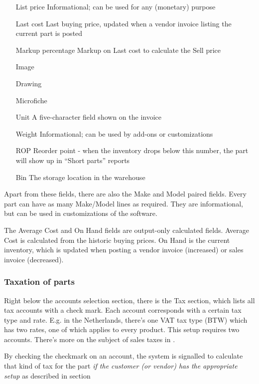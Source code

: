 \begin{itemize}
\item [List price] Informational; can be used for any (monetary) purpose
\item [Last cost] Last buying price, updated when a vendor invoice listing the current part
    is posted
\item [Markup percentage] Markup on Last cost to calculate the Sell price
\item [Image]
\item [Drawing]
\item [Microfiche]
\item [Unit] A five-character field shown on the invoice
\item [Weight] Informational; can be used by add-ons or customizations
\item [ROP] Reorder point - when the inventory drops below this number,
     the part will show up in ``Short parts'' reports
\item [Bin] The storage location in the warehouse
\end{itemize}


Apart from these fields, there are also the Make and Model paired fields. Every part
can have as many Make/Model lines as required. They are informational, but can be used
in customizations of the software.

The Average Cost and On Hand fields are output-only calculated fields. Average Cost is
calculated from the historic buying prices. On Hand is the current inventory, which is
updated when posting a vendor invoice (increased) or sales invoice (decreased).



\subsubsection{Taxation of parts}
\label{subsubsec-products-parts-taxation}

Right below the accounts selection section, there is the Tax section, which lists
all tax accounts with a check mark. Each account corresponds with a certain tax type
and rate. E.g. in the Netherlands, there's one VAT tax type (BTW) which has two rates,
one of which applies to every product. This setup requires two accounts. There's more
on the subject of sales taxes in .

By checking the checkmark on an account, the system is signalled to calculate that
kind of tax for the part {\it if the customer (or vendor) has the appropriate setup}
as described in section


